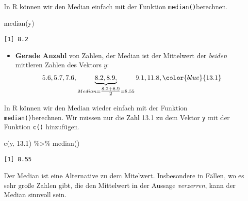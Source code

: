 \documentclass[
  letterpaper,
  DIV=11,
  oneside]{scrreport}
\newenvironment{Shaded}{\begin{snugshade}}{\end{snugshade}}
\newcommand{\FloatTok}[1]{\textcolor[rgb]{0.68,0.00,0.00}{#1}}
\newcommand{\FunctionTok}[1]{\textcolor[rgb]{0.28,0.35,0.67}{#1}}
\newcommand{\NormalTok}[1]{\textcolor[rgb]{0.00,0.23,0.31}{#1}}
\newcommand{\SpecialCharTok}[1]{\textcolor[rgb]{0.37,0.37,0.37}{#1}}
\providecommand{\tightlist}{%
  \setlength{\itemsep}{0pt}\setlength{\parskip}{0pt}}\usepackage{longtable,booktabs,array}
\begin{document}
In R können wir den Median einfach mit der Funktion
\texttt{median()}berechnen.

\begin{Shaded}
\begin{Highlighting}[]
\FunctionTok{median}\NormalTok{(y) }
\end{Highlighting}
\end{Shaded}

\begin{verbatim}
[1] 8.2
\end{verbatim}

\begin{itemize}
\tightlist
\item
  \textbf{Gerade Anzahl} von Zahlen, der Median ist der Mittelwert der
  \emph{beiden} mittleren Zahlen des Vektors \(y\): \[
  5.6,  5.7,  7.6,  \underbrace{8.2, 8.9,}_{Median = \tfrac{8.2+8.9}{2}=8.55} 9.1, 11.8, \color{blue}{13.1}
  \]
\end{itemize}

In R können wir den Median wieder einfach mit der Funktion
\texttt{median()}berechnen. Wir müssen nur die Zahl 13.1 zu dem Vektor
\texttt{y} mit der Funktion \texttt{c()} hinzufügen.

\begin{Shaded}
\begin{Highlighting}[]
\FunctionTok{c}\NormalTok{(y, }\FloatTok{13.1}\NormalTok{) }\SpecialCharTok{\%\textgreater{}\%} \FunctionTok{median}\NormalTok{() }
\end{Highlighting}
\end{Shaded}

\begin{verbatim}
[1] 8.55
\end{verbatim}

{}

Der Median ist eine Alternative zu dem Mitelwert. Insbesondere in
Fällen, wo es sehr große Zahlen gibt, die den Mittelwert in der Aussage
\emph{verzerren}, kann der Median sinnvoll sein.
\end{document}

